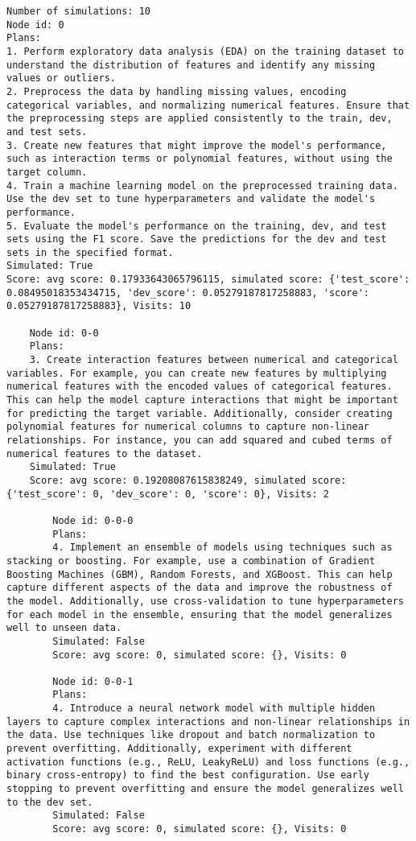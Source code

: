 \begin{lstlisting}[style=txtfile]
Number of simulations: 10
Node id: 0
Plans: 
1. Perform exploratory data analysis (EDA) on the training dataset to understand the distribution of features and identify any missing values or outliers.
2. Preprocess the data by handling missing values, encoding categorical variables, and normalizing numerical features. Ensure that the preprocessing steps are applied consistently to the train, dev, and test sets.
3. Create new features that might improve the model's performance, such as interaction terms or polynomial features, without using the target column.
4. Train a machine learning model on the preprocessed training data. Use the dev set to tune hyperparameters and validate the model's performance.
5. Evaluate the model's performance on the training, dev, and test sets using the F1 score. Save the predictions for the dev and test sets in the specified format.
Simulated: True
Score: avg score: 0.17933643065796115, simulated score: {'test_score': 0.08495018353434715, 'dev_score': 0.05279187817258883, 'score': 0.05279187817258883}, Visits: 10

	Node id: 0-0
	Plans: 
	3. Create interaction features between numerical and categorical variables. For example, you can create new features by multiplying numerical features with the encoded values of categorical features. This can help the model capture interactions that might be important for predicting the target variable. Additionally, consider creating polynomial features for numerical columns to capture non-linear relationships. For instance, you can add squared and cubed terms of numerical features to the dataset.
	Simulated: True
	Score: avg score: 0.19208087615838249, simulated score: {'test_score': 0, 'dev_score': 0, 'score': 0}, Visits: 2

		Node id: 0-0-0
		Plans: 
		4. Implement an ensemble of models using techniques such as stacking or boosting. For example, use a combination of Gradient Boosting Machines (GBM), Random Forests, and XGBoost. This can help capture different aspects of the data and improve the robustness of the model. Additionally, use cross-validation to tune hyperparameters for each model in the ensemble, ensuring that the model generalizes well to unseen data.
		Simulated: False
		Score: avg score: 0, simulated score: {}, Visits: 0

		Node id: 0-0-1
		Plans: 
		4. Introduce a neural network model with multiple hidden layers to capture complex interactions and non-linear relationships in the data. Use techniques like dropout and batch normalization to prevent overfitting. Additionally, experiment with different activation functions (e.g., ReLU, LeakyReLU) and loss functions (e.g., binary cross-entropy) to find the best configuration. Use early stopping to prevent overfitting and ensure the model generalizes well to the dev set.
		Simulated: False
		Score: avg score: 0, simulated score: {}, Visits: 0


\end{lstlisting}
